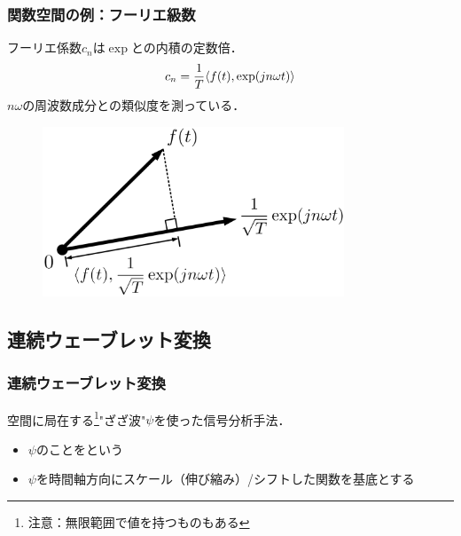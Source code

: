 \documentclass[dvipdfmx,graphicx,14pt]{beamer}
\begin{document}
\begin{frame}[c]
    \frametitle{関数空間の例：フーリエ級数}
    フーリエ係数$c_{n}$は$\exp$との内積の定数倍．
    \begin{align}
        c_{n} = \frac{1}{T} \langle f(t), \exp(jn\omega t) \rangle
    \end{align}
    $n\omega$の周波数成分との類似度を測っている．
    \begin{figure}
        \includegraphics[width=90mm]{./figs/fourior_function_projection.png}
    \end{figure}
\end{frame}

\subsection{連続ウェーブレット変換}

\begin{frame}[c]
    \frametitle{連続ウェーブレット変換}
    空間に局在する\footnote{注意：無限範囲で値を持つものもある}"ざざ波"$\psi$を使った信号分析手法．
    \begin{itemize}
        \item $\psi$のことをという
        \item $\psi$を時間軸方向にスケール（伸び縮み）/シフトした関数を基底とする
    \end{itemize}
\end{frame}
\end{document}

